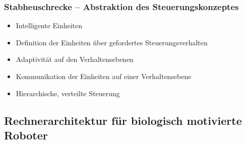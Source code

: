 \subsubsection{Stabheuschrecke – Abstraktion des Steuerungskonzeptes}
\begin{itemize}
\item Intelligente Einheiten
\item Definition der Einheiten über gefordertes Steuerungsverhalten
\item Adaptivität auf den Verhaltensebenen
\item Kommunikation der Einheiten auf einer Verhaltensebene
\item Hierarchische, verteilte Steuerung
\end{itemize}
\newpage
\subsection{Rechnerarchitektur für biologisch motivierte Roboter}
